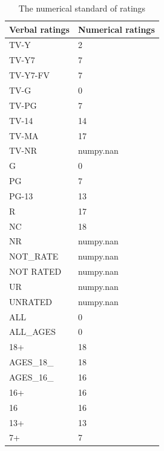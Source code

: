 \documentclass{article}
\begin{document}
\begin{table}[!htb]
	\centering
	\caption{The numerical standard of ratings}
	\label{tab:numerical_ratings}
	\begin{tabular}{@{}ll@{}}
	\toprule
	Verbal ratings & Numerical ratings \\ \midrule
	TV-Y           & 2                 \\
	TV-Y7          & 7                 \\
	TV-Y7-FV       & 7                 \\
	TV-G           & 0                 \\
	TV-PG          & 7                 \\
	TV-14          & 14                \\
	TV-MA          & 17                \\
	TV-NR          & numpy.nan         \\
	G              & 0                 \\
	PG             & 7                 \\
	PG-13          & 13                \\
	R              & 17                \\
	NC             & 18                \\
	NR             & numpy.nan         \\
	NOT\_RATE      & numpy.nan         \\
	NOT RATED      & numpy.nan         \\
	UR             & numpy.nan         \\
	UNRATED        & numpy.nan         \\
	ALL            & 0                 \\
	ALL\_AGES      & 0                 \\
	18+            & 18                \\
	AGES\_18\_     & 18                \\
	AGES\_16\_     & 16                \\
	16+            & 16                \\
	16             & 16                \\
	13+            & 13                \\
	7+             & 7                 \\ \bottomrule
	\end{tabular}
\end{table}
\end{document}
